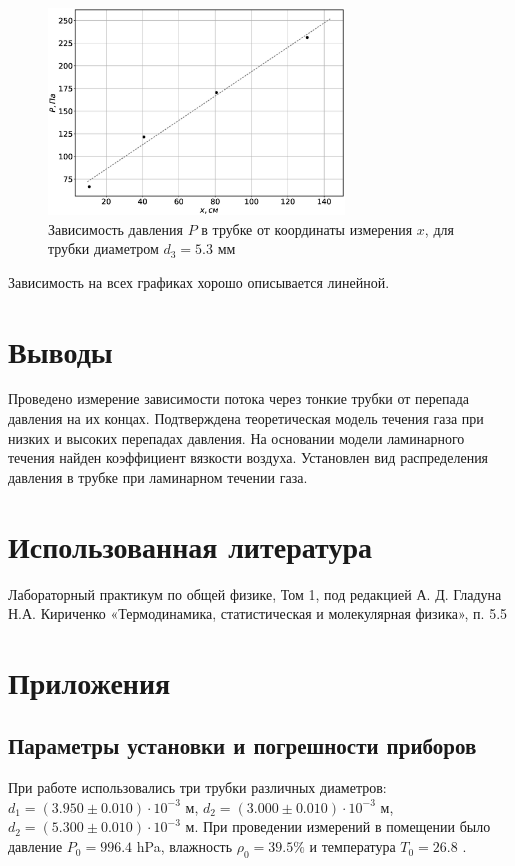 \documentclass[12pt]{article}
\begin{document}
\begin{figure}[H]
    \centering
    \includegraphics[width=0.7\textwidth]{xP3.eps}
    \caption{Зависимость давления $P$ в трубке от координаты измерения $x$, для трубки
        диаметром $d_3 = 5.3$ мм}
    \label{fig:xP3}
\end{figure}
Зависимость на всех графиках хорошо описывается линейной.
\section{Выводы}
Проведено измерение зависимости потока через тонкие трубки от перепада давления на их концах. 
Подтверждена теоретическая модель течения газа при низких и высоких перепадах давления. 
На основании модели ламинарного течения найден коэффициент вязкости воздуха. 
Установлен вид распределения давления в трубке при ламинарном течении газа.

\section{Использованная литература}
\begin{thebibliography}{9}
    Лабораторный практикум по общей физике, Том 1, под редакцией А. Д. Гладуна
    Н.А. Кириченко «Термодинамика, статистическая и молекулярная физика», п. 5.5
\end{thebibliography}

\section{Приложения}
\subsection{Параметры установки и погрешности приборов} \label{app_1}
При работе использовались три трубки различных диаметров: $d_1 = (3.950 \pm 0.010) \cdot 10 ^ {-3}$ м, $d_2 = (3.000 \pm 0.010) \cdot 10 ^ {-3}$ м, $d_2 = (5.300 \pm 0.010) \cdot 10 ^ {-3}$ м. 
При проведении измерений в помещении было давление $P_0 = 996.4$ hPa, влажность $\rho_0 = 39.5 \%$ и 
температура $T_0 = 26.8$ \textcelsius.     
\end{document}
